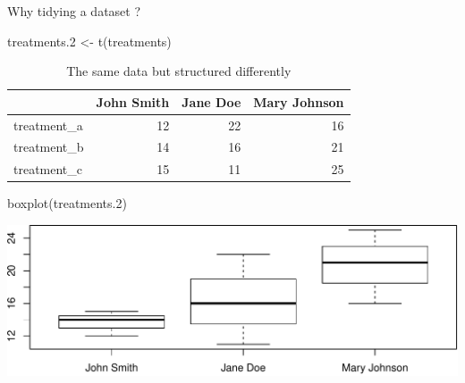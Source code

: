 \documentclass[14pt,ignorenonframetext,]{bredelebeamer}
\newenvironment{Shaded}{\begin{snugshade}}{\end{snugshade}}
\newcommand{\KeywordTok}[1]{\textcolor[rgb]{0.94,0.87,0.69}{#1}}
\newcommand{\DecValTok}[1]{\textcolor[rgb]{0.86,0.86,0.80}{#1}}
\newcommand{\StringTok}[1]{\textcolor[rgb]{0.80,0.58,0.58}{#1}}
\newcommand{\NormalTok}[1]{\textcolor[rgb]{0.80,0.80,0.80}{#1}}
\begin{document}
\begin{frame}[fragile]{Why tidying a dataset ?}

\begin{Shaded}
\begin{Highlighting}[]
\NormalTok{treatments.}\DecValTok{2}\NormalTok{ <-}\StringTok{ }\KeywordTok{t}\NormalTok{(treatments)}
\end{Highlighting}
\end{Shaded}

\begin{center}
\begin{table}[t]

\caption{\label{tab:unnamed-chunk-4}The same data but structured differently}
\centering
\begin{tabular}{l|r|r|r}
\hline
  & John Smith & Jane Doe & Mary Johnson\\
\hline
treatment\_a & 12 & 22 & 16\\
\hline
treatment\_b & 14 & 16 & 21\\
\hline
treatment\_c & 15 & 11 & 25\\
\hline
\end{tabular}
\end{table}
\end{center}

\begin{Shaded}
\begin{Highlighting}[]
\KeywordTok{boxplot}\NormalTok{(treatments.}\DecValTok{2}\NormalTok{)}
\end{Highlighting}
\end{Shaded}

\includegraphics{tidyverse_28_03_files/figure-beamer/boxplot2-1.pdf}

\end{frame}
\end{document}
